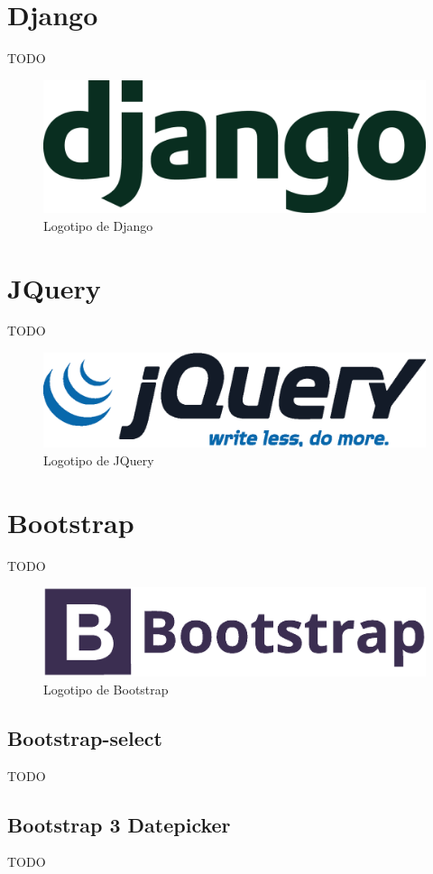 \section{Django}

TODO

\begin{figure}[!htbp]
	\centering
	\includegraphics[scale=0.18]{fig/django_logo}
	\caption{Logotipo de Django}
\end{figure}

\section{JQuery}

TODO

\begin{figure}[!htbp]
	\centering
	\includegraphics[scale=0.6]{fig/jquery_logo}
	\caption{Logotipo de JQuery}
\end{figure}

\section{Bootstrap}

TODO

\begin{figure}[!htbp]
	\centering
	\includegraphics[scale=0.45]{fig/bootstrap_logo}
	\caption{Logotipo de Bootstrap}
\end{figure}

\subsection{Bootstrap-select}

TODO

\subsection{Bootstrap 3 Datepicker}

TODO